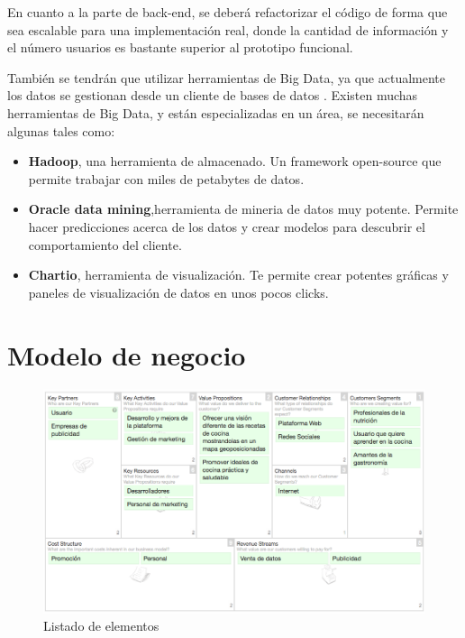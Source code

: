 \vspace{5 mm}

En cuanto a la parte de back-end, se deberá refactorizar el código de forma que sea escalable para una implementación real, donde la cantidad de información y el número usuarios es bastante superior al prototipo funcional. 

\vspace{5 mm}

También se tendrán que utilizar herramientas de Big Data, ya que actualmente los datos se gestionan desde un cliente de bases de datos \cite{big-data-tools}. 
Existen muchas herramientas de Big Data, y están especializadas en un área, se necesitarán algunas tales como:


\begin{itemize}
  \item \textbf{Hadoop}, una herramienta de almacenado. Un framework open-source que permite trabajar con miles de petabytes de datos.
  \item \textbf{Oracle data mining},herramienta de mineria de datos muy potente. Permite hacer predicciones acerca de los datos y crear modelos para descubrir el comportamiento del cliente.
  \item \textbf{Chartio}, herramienta de visualización. Te permite crear potentes gráficas y paneles de visualización de datos en unos pocos clicks.
\end{itemize}

\section{Modelo de negocio}

\begin{figure}
\begin{center}
\includegraphics[width=1.0\textwidth]{imagenes/business-canvas.png}
\caption{Listado de elementos}
\label{business-canvas}
\end{center}
\end{figure}

